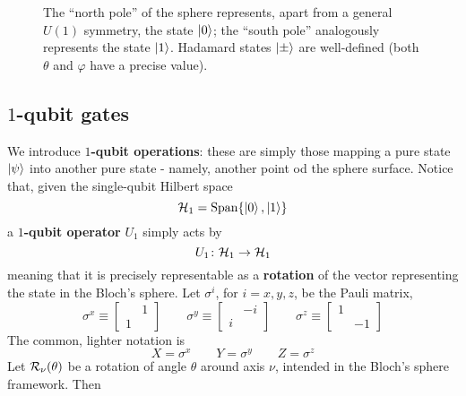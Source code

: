 \begin{figure}
    \centering
    
    \caption{The ``north pole'' of the sphere represents, apart from a general $U(1)$ symmetry, the state $\ket{0}$; the ``south pole'' analogously represents the state $\ket{1}$. Hadamard states $\ket{\pm}$ are well-defined (both $\theta$ and $\varphi$ have a precise value).}
    \label{fig:bloch sphere poles}
\end{figure}

\subsection{$1$-qubit gates}

We introduce \textbf{$1$-qubit operations}: these are simply those mapping a pure state $\ket{\psi}$ into another pure state - namely, another point od the sphere surface. Notice that, given the single-qubit Hilbert space
\[
    \mathcal{H}_1 =  \operatorname{Span} \lbrace \ket{0}, \ket{1} \rbrace
\]
a \textbf{$1$-qubit operator} $U_1$ simply acts by
\[
    U_1 \colon \mathcal{H}_1 \to \mathcal{H}_1
\]
meaning that it is precisely representable as a \textbf{rotation} of the vector representing the state in the Bloch's sphere. Let $\sigma^i$, for $i=x,y,z$, be the Pauli matrix,
\[
    \sigma^x \equiv \begin{bmatrix} & 1 \\ 1 & \end{bmatrix}
    \qquad
    \sigma^y \equiv \begin{bmatrix} & -i \\ i & \end{bmatrix}
    \qquad
    \sigma^z \equiv \begin{bmatrix} 1 & \\ & -1 \end{bmatrix}
\]
The common, lighter notation is
\[
    X = \sigma^x
    \qquad
    Y = \sigma^y
    \qquad
    Z = \sigma^z
\]
Let $\mathcal{R}_\nu (\theta)$ be a rotation of angle $\theta$ around axis $\nu$, intended in the Bloch's sphere framework. Then
